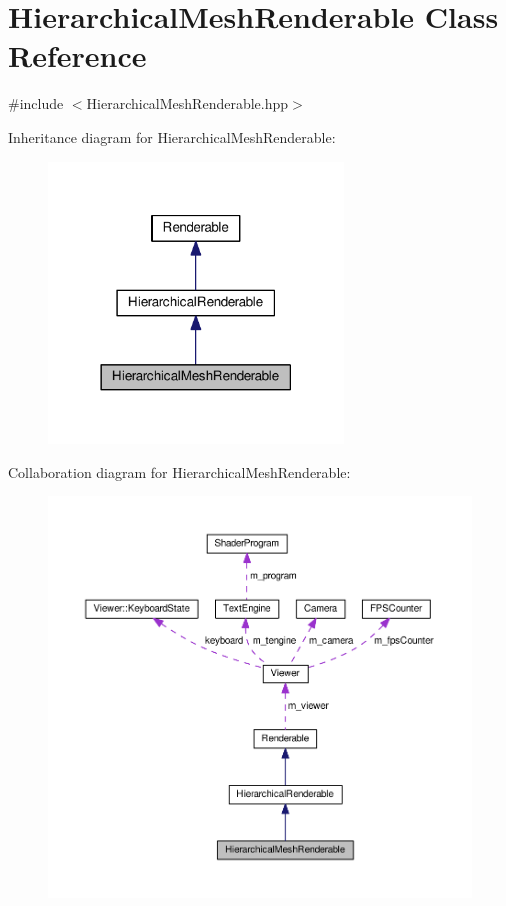 \hypertarget{classHierarchicalMeshRenderable}{\section{Hierarchical\+Mesh\+Renderable Class Reference}
\label{classHierarchicalMeshRenderable}
}


{\ttfamily \#include $<$Hierarchical\+Mesh\+Renderable.\+hpp$>$}



Inheritance diagram for Hierarchical\+Mesh\+Renderable\+:\nopagebreak
\begin{figure}[H]
\begin{center}
\leavevmode
\includegraphics[width=222pt]{classHierarchicalMeshRenderable__inherit__graph}
\end{center}
\end{figure}


Collaboration diagram for Hierarchical\+Mesh\+Renderable\+:\nopagebreak
\begin{figure}[H]
\begin{center}
\leavevmode
\includegraphics[width=350pt]{classHierarchicalMeshRenderable__coll__graph}
\end{center}
\end{figure}
